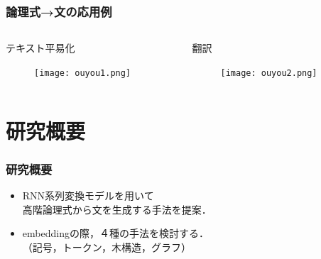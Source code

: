 \documentclass[dvipdfmx]{beamer}
\begin{document}
\begin{frame}
\frametitle{論理式→文の応用例}

\begin{columns}[t]
    \begin{column}{0.5\textwidth} %
      \begin{block}{テキスト平易化}
        \begin{figure}[h]
        	\texttt{[image: ouyou1.png]}
                \label{fig:application1}
        \end{figure}
      \end{block}
    \end{column}
    \begin{column}{0.5\textwidth} %
      \begin{block}{翻訳}
        \begin{figure}[h]
        	\texttt{[image: ouyou2.png]}
                \label{fig:application2}
        \end{figure}
      \end{block}
    \end{column}
\end{columns}

\end{frame}



\section{研究概要}
\begin{frame}
\frametitle{研究概要}
\begin{center}
\end{center}

\begin{itemize}
  \item RNN系列変換モデルを用いて\\高階論理式から文を生成する手法を提案．
  \item embeddingの際，４種の手法を検討する．\\（記号，トークン，木構造，グラフ）　
\end{itemize}


\end{frame}
\end{document}
